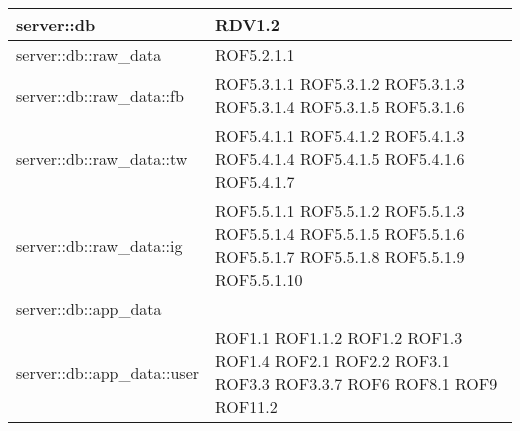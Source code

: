 \begin{center}
\begin{longtable}{| p{9cm} | p{4cm} |}
\hline
server::db  & RDV1.2 \newline \\
\hline
server::db::raw\_data  &  ROF5.2.1.1 \newline \\
\hline
server::db::raw\_data::fb  & ROF5.3.1.1 \newline ROF5.3.1.2 \newline ROF5.3.1.3 \newline ROF5.3.1.4 \newline ROF5.3.1.5 \newline ROF5.3.1.6 \newline \\
\hline
server::db::raw\_data::tw  & ROF5.4.1.1 \newline ROF5.4.1.2 \newline ROF5.4.1.3 \newline ROF5.4.1.4 \newline ROF5.4.1.5 \newline ROF5.4.1.6  \newline ROF5.4.1.7 \newline \\
\hline
server::db::raw\_data::ig  & ROF5.5.1.1 \newline ROF5.5.1.2 \newline ROF5.5.1.3 \newline ROF5.5.1.4 \newline ROF5.5.1.5 \newline ROF5.5.1.6  \newline ROF5.5.1.7 \newline ROF5.5.1.8 \newline ROF5.5.1.9 \newline ROF5.5.1.10 \newline \\
\hline
server::db::app\_data  &   \newline\\
\hline
server::db::app\_data::user  &  ROF1.1 \newline ROF1.1.2 \newline ROF1.2 \newline ROF1.3 \newline ROF1.4 \newline ROF2.1 \newline ROF2.2 \newline ROF3.1 \newline ROF3.3 \newline ROF3.3.7 \newline ROF6 \newline ROF8.1 \newline ROF9 \newline ROF11.2 \newline \\

\end{longtable}
\end{center}
